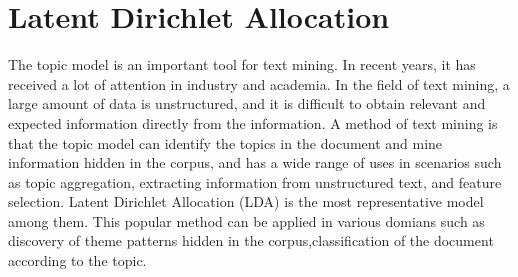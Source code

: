 \chapter{Latent Dirichlet Allocation}\label{cha}


The topic model is an important tool for text mining. In recent years, it has received a lot of attention in industry and academia. In the field of text mining, a large amount of data is unstructured, and it is difficult to obtain relevant and expected information directly from the information. A method of text mining is that the topic model  can identify the topics in the document and mine information  hidden in the corpus, and has a wide range of uses in scenarios such as topic aggregation, extracting information from unstructured text, and feature selection.
Latent Dirichlet Allocation (LDA) \cite{origin}is the most representative model among them. This popular method can be applied in various domians such as discovery of theme patterns hidden in the corpus,classification of  the document according to the topic.

